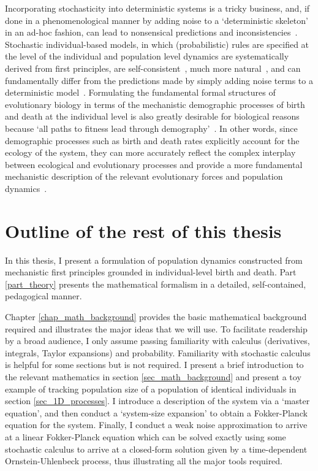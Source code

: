 Incorporating stochasticity into deterministic systems is a tricky business, and, if done in a phenomenological manner by adding noise to a `deterministic skeleton'~\citep{coulson_skeletons_2004} in an ad-hoc fashion, can lead to nonsensical predictions and inconsistencies~\citep{strang_how_2019}. Stochastic individual-based models, in which (probabilistic) rules are specified at the level of the individual and population level dynamics are systematically derived from first principles, are self-consistent~\citep{strang_how_2019}, much more natural~\citep{black_stochastic_2012}, and can fundamentally differ from the predictions made by simply adding noise terms to a deterministic model~\citep{strang_how_2019}. Formulating the fundamental formal structures of evolutionary biology in terms of the mechanistic demographic processes of birth and death at the individual level is also greatly desirable for biological reasons~\citep{metcalf_why_2007,geritz_mathematical_2012} because `all paths to fitness lead through demography'~\citep{metcalf_all_2007}. In other words, since demographic processes such as birth and death rates explicitly account for the ecology of the system, they can more accurately reflect the complex interplay between ecological and evolutionary processes and provide a more fundamental mechanistic description of the relevant evolutionary forces and population dynamics~\citep{doebeli_towards_2017}. 

\section{Outline of the rest of this thesis}

In this thesis, I present a formulation of population dynamics constructed from mechanistic first principles grounded in individual-level birth and death. Part \ref{part_theory} presents the mathematical formalism in a detailed, self-contained, pedagogical manner.

Chapter \ref{chap_math_background} provides the basic mathematical background required and illustrates the major ideas that we will use. To facilitate readership by a broad audience, I only assume passing familiarity with calculus (derivatives, integrals, Taylor expansions) and probability. Familiarity with stochastic calculus is helpful for some sections but is not required. I present a brief introduction to the relevant mathematics in section \ref{sec_math_background} and present a toy example of tracking population size of a population of identical individuals in section \ref{sec_1D_processes}. I introduce a description of the system via a `master equation', and then conduct a `system-size expansion' to obtain a Fokker-Planck equation for the system. Finally, I conduct a weak noise approximation to arrive at a linear Fokker-Planck equation which can be solved exactly using some stochastic calculus to arrive at a closed-form solution given by a time-dependent Ornstein-Uhlenbeck process, thus illustrating all the major tools required.


